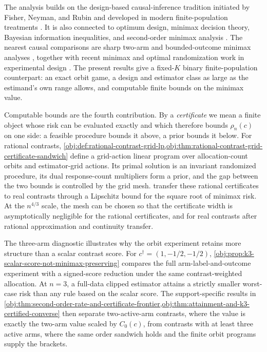 The analysis builds on the design-based causal-inference tradition initiated by Fisher, Neyman, and Rubin and developed in modern finite-population treatments \citep{fisher_1935,neyman_1990,rubin_1974,rubin_1978,holland_1986,imbens_rubin_2015,imbens_wooldridge_2009,athey_imbens_2017,ding_2024}. It is also connected to optimum design, minimax decision theory, Bayesian information inequalities, and second-order minimax analysis \citep{smith_1918,kiefer_1959,kiefer_1974,atkinson_2007,wald_1950,lecam_1986,ibragimov_1981,rao_1945,van_trees_1968,gill_1995,levit_1981_second_order,bickel_1981,pinsker_1980,johnstone_1992}. The nearest causal comparisons are sharp two-arm and bounded-outcome minimax analyses \citep{sudijono_dobriban_tchetgen_2026_sharp,hull_2026_bounded}, together with recent minimax and optimal randomization work in experimental design \citep{kallus_2018,kallus_2020_optimality,bai_2023_why,harshaw_2024,basse_2023,derezinski_2019,hu_2024,kandiros_2024,kandiros_2026}. The present results give a fixed-\(K\) binary finite-population counterpart: an exact orbit game, a design and estimator class as large as the estimand's own range allows, and computable finite bounds on the minimax value.

Computable bounds are the fourth contribution. By a \emph{certificate} we mean a finite object whose risk can be evaluated exactly and which therefore bounds \(\rho_n(c)\) on one side: a feasible procedure bounds it above, a prior bounds it below. For rational contrasts, \cref{obj:def:rational-contrast-grid-lp,obj:thm:rational-contrast-grid-certificate-sandwich} define a grid-action linear program over allocation-count orbits and estimator-grid actions. Its primal solution is an invariant randomized procedure, its dual response-count multipliers form a prior, and the gap between the two bounds is controlled by the grid mesh.  transfer these rational certificates to real contrasts through a Lipschitz bound for the square root of minimax risk. At the \(n^{4/3}\) scale, the mesh can be chosen so that the certificate width is asymptotically negligible for the rational certificates, and for real contrasts after rational approximation and continuity transfer.

The three-arm diagnostic illustrates why the orbit experiment retains more structure than a scalar contrast score. For \(c^\dagger=(1,-1/2,-1/2)\), \cref{obj:prop:k3-scalar-score-not-minimax-preserving} compares the full arm-label-and-outcome experiment with a signed-score reduction under the same contrast-weighted allocation. At \(n=3\), a full-data clipped estimator attains a strictly smaller worst-case risk than any rule based on the scalar score. The support-specific results in \cref{obj:thm:second-order-rate-and-certificate-frontier,obj:thm:attainment-and-k3-certified-converse} then separate two-active-arm contrasts, where the value is exactly the two-arm value scaled by \(C_0(c)\), from contrasts with at least three active arms, where the same order sandwich holds and the finite orbit programs supply the brackets.

